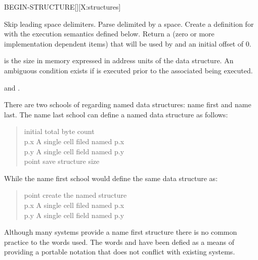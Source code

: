 \begin{worddef}{}{BEGIN-STRUCTURE}[][X:structures]
\item {}

	Skip leading space delimiters. Parse  delimited
	by a space. Create a definition for  with the
	execution semantics defined below.  Return a 
	(zero or more implementation dependent items) that will be
	used by  and an initial offset of 0.

\execute[name]

	 is the size in memory expressed in address units of
	the data structure.  An ambiguous condition exists if
	 is executed prior to the associated
	 being executed.

\see {} and
	.

	\begin{rationale} %
		There are two schools of  regarding named data
		structures: name first and name last.  The name last
		school can define a named data structure as follows:

		\begin{quote} \tab[11.5]  initial total byte count \\
		   p.x	\tab {} A single cell filed named p.x \\
		   p.y   \tab {} A single cell field named p.y \\
		 point \tab[3.8]  save structure size
		\end{quote}

		While the name first school would define the same data
		structure as:

		\begin{quote}\ttfamily
		 point \tab[-.3]  create the named structure \\
		   p.x	\tab {} A single cell filed named p.x \\
		   p.y   \tab {} A single cell field named p.y \\
		\end{quote}

		Although many systems provide a name first structure there
		is no common practice to the words used.  The words
		 and  have been
		defied as a means of providing a portable notation that does
		not conflict with existing systems.


\end{rationale}
\end{worddef}
